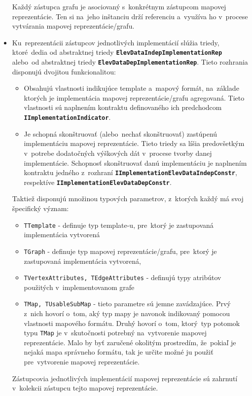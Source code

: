 \begin{itemize}
    Každý zástupca grafu je asociovaný s~konkrétnym zástupcom mapovej reprezentácie. Ten si na~jeho inštanciu drží referenciu a~využíva ho v~procese vytvárania mapovej reprezentácie/grafu.

    \item Ku~reprezentácii zástupcov jednotlivých implementácií slúžia triedy, ktoré~dedia od abstraktnej triedy \textbf{\texttt{ElevDataIndepImplementationRep}} alebo~od abstraktnej triedy \textbf{\texttt{ElevDataDepImplementationRep}}. Tieto rozhrania disponujú dvojitou funkcionalitou:
    \begin{itemize}
        \item Obsahujú vlastnosti indikujúce template a~mapový formát, na~základe ktorých je implementácia mapovej reprezentácie/grafu agregovaná. Tieto vlastnosti sú naplnením kontraktu definovaného ich predchodcom \textbf{\texttt{IImplementationIndicator}}.
        \item Je schopná skonštruovať (alebo~nechať skonštruovať) zastúpenú implementáciu mapovej reprezentácie. Tieto triedy sa líšia predovšetkým v~potrebe dodatočných výškových dát v~procese tvorby danej implementácie. Schopnosť skonštruovať danú implementáciu je naplnením kontraktu jedného z~rozhraní \textbf{\texttt{IImplementationElevDataIndepConstr}}, respektíve \textbf{\texttt{IImplementationElevDataDepConstr}}. 
    \end{itemize}
    Taktiež disponujú množinou typových parametrov, z~ktorých každý má svoj špecifický význam:
    \begin{itemize}
        \item \texttt{TTemplate} - definuje typ template-u, pre~ktorý je zastupovaná implementácia vytvorená
        \item \texttt{TGraph} - definuje typ mapovej reprezentácie/grafu, pre~ktorý je zastupovaná implementácia vytvorená,
        \item \texttt{TVertexAttributes, TEdgeAttributes} - definujú typy atribútov použitých v~implementovanom grafe
        \item \texttt{TMap, TUsableSubMap} - tieto parametre sú jemne zavádzajúce. Prvý z~nich hovorí o~tom, aký typ mapy je navonok indikovaný pomocou vlastnosti mapového formátu. Druhý hovorí o~tom, ktorý~typ potomok typu \texttt{TMap} je v~skutočnosti potrebný na~vytvorenie mapovej reprezentácie. Malo by byť zaručené okolitým prostredím, že~pokiaľ je nejaká mapa správneho formátu, tak je určite možné ju použiť pre~vytvorenie mapovej reprezentácie. 
    \end{itemize}
    
    Zástupcovia jednotlivých implementácií mapovej reprezentácie sú zahrnutí v~kolekcii zástupcu tejto mapovej reprezentácie.

\end{itemize}

